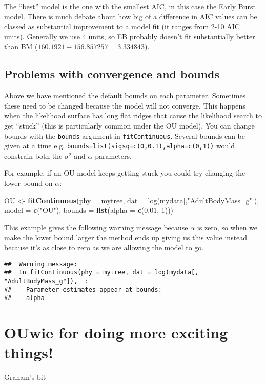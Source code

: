 \documentclass[11pt]{article}
\newcommand{\KeywordTok}[1]{\textcolor[rgb]{0.13,0.29,0.53}{\textbf{{#1}}}}
\newcommand{\DataTypeTok}[1]{\textcolor[rgb]{0.13,0.29,0.53}{{#1}}}
\newcommand{\DecValTok}[1]{\textcolor[rgb]{0.00,0.00,0.81}{{#1}}}
\newcommand{\CharTok}[1]{\textcolor[rgb]{0.31,0.60,0.02}{{#1}}}
\newcommand{\StringTok}[1]{\textcolor[rgb]{0.31,0.60,0.02}{{#1}}}
\newcommand{\NormalTok}[1]{{#1}}
\begin{document}
The ``best'' model is the one with the smallest AIC, in this case the Early Burst model. There is much debate about how big of a difference in AIC values can be classed as substantial improvement to a model fit (it ranges from 2-10 AIC units). Generally we use 4 units, so EB probably doesn't fit substantially better than BM ($160.1921 - 156.857257 = 3.334843$). 

\subsection{Problems with convergence and bounds}
\label{bounds}

Above we have mentioned the default bounds on each parameter. Sometimes these need to be changed because the model will not converge. This happens when the likelihood surface has long flat ridges that cause the likelihood search to get ``stuck'' (this is particularly common under the OU model). You can change bounds with the \texttt{bounds} argument in \texttt{fitContinuous}. Several bounds can be given at a time e.g. \texttt{bounds=list(sigsq=c(0,0.1),alpha=c(0,1))} would constrain both the $\sigma^2$ and $\alpha$ parameters.

For example, if an OU model keeps getting stuck you could try changing the lower bound on $\alpha$:

\begin{snugshade}
\begin{Highlighting}[]
\NormalTok{OU <-}\StringTok{ }\KeywordTok{fitContinuous}\NormalTok{(\DataTypeTok{phy = }mytree, \DataTypeTok{dat = }log(mydata[,"AdultBodyMass_g"]),} 
                    \DataTypeTok{model = }\KeywordTok{c}\NormalTok{(}\StringTok{"}\CharTok{OU}\StringTok{"}\NormalTok{), }\DataTypeTok{bounds = }\KeywordTok{list}\NormalTok{(}\DataTypeTok{alpha = }\KeywordTok{c}\NormalTok{(}\DecValTok{0.01}\NormalTok{, }\DecValTok{1}\NormalTok{)))}

\end{Highlighting}
\end{snugshade}

This example gives the following warning message because $\alpha$ is zero, so when we make the lower bound larger the method ends up giving us this value instead because it's as close to zero as we are allowing the model to go.

\begin{verbatim}
##  Warning message:
##  In fitContinuous(phy = mytree, dat = log(mydata[, "AdultBodyMass_g"]),  :
##    Parameter estimates appear at bounds:
##    alpha
\end{verbatim}

\section{OUwie for doing more exciting things!}

Graham's bit
\end{document}
